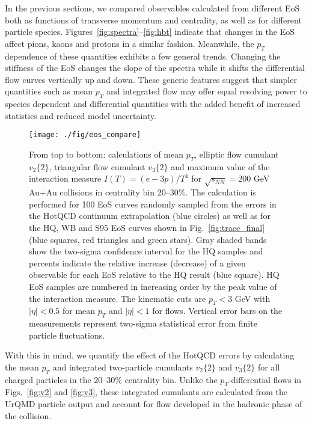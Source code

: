 \documentclass[aps,prc,reprint,amsmath,nofootinbib,superscriptaddress]{revtex4-1}
\begin{document}
In the previous sections, we compared observables calculated from different EoS both as functions of transverse momentum and centrality, as well as for different particle species. Figures~\ref{fig:spectra}--\ref{fig:hbt} indicate that changes in the EoS affect pions, kaons and protons in a similar fashion. Meanwhile, the $p_T$ dependence of these quantities exhibits a few general trends. Changing the stiffness of the EoS changes the slope of the spectra while it shifts the differential flow curves vertically up and down. These generic features suggest that simpler quantities such as mean $p_T$ and integrated flow may offer equal resolving power to species dependent and differential quantities with the added benefit of increased statistics and reduced model uncertainty.

\begin{figure}
  \texttt{[image: ./fig/eos\_compare]}
  \caption{
    \label{fig:eos_compare}
    From top to bottom: calculations of mean $p_T$, elliptic flow cumulant $v_2\{2\}$, triangular flow cumulant $v_3\{2\}$ and maximum value of the interaction measure 
    $I(T) = (e - 3 p)/T^4$ for $\sqrt{s_{NN}}=200$ GeV Au+Au collisions in centrality bin 20--30\%. The calculation is performed for 100 EoS curves randomly sampled from the 
    errors in the HotQCD continuum extrapolation (blue circles) as well as for the HQ, WB and S95 EoS curves shown in Fig.~\ref{fig:trace_final} (blue squares, red triangles 
    and green stars). Gray shaded bands show the two-sigma confidence interval for the HQ samples and percents indicate the relative increase (decrease) of a given observable for each EoS 
    relative to the HQ result (blue square). HQ EoS samples are numbered in increasing order by the peak value of the interaction measure. The kinematic cuts are $p_T < 3$ GeV with 
    $|\eta| < 0.5$ for mean $p_T$ and $|\eta| < 1$ for flows. Vertical error bars on the measurements represent two-sigma statistical error from finite particle fluctuations.
  }
\end{figure}

With this in mind, we quantify the effect of the HotQCD errors by calculating the mean $p_T$ and integrated two-particle cumulants $v_2\{2\}$ and $v_3\{2\}$ for all charged particles in the 20--30\% centrality bin. Unlike the $p_T$-differential flows in Figs.~\ref{fig:v2} and \ref{fig:v3}, these integrated cumulants are calculated from the UrQMD particle output and account for flow developed in the hadronic phase of the collision. 
\end{document}
